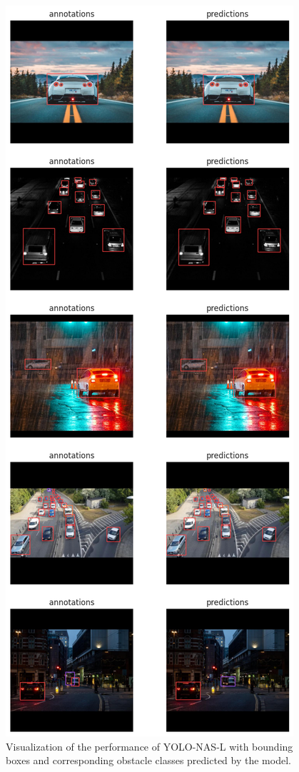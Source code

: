 \begin{figure}[H]
    \centering
    \includegraphics[width=0.6\linewidth]{tex/img/YNL2_Ann_Pred_2.png}
    \caption{Visualization of the performance of YOLO-NAS-L with bounding boxes and corresponding obstacle
classes predicted by the model.}
    \label{fig:L-annot-pred}
\end{figure}

